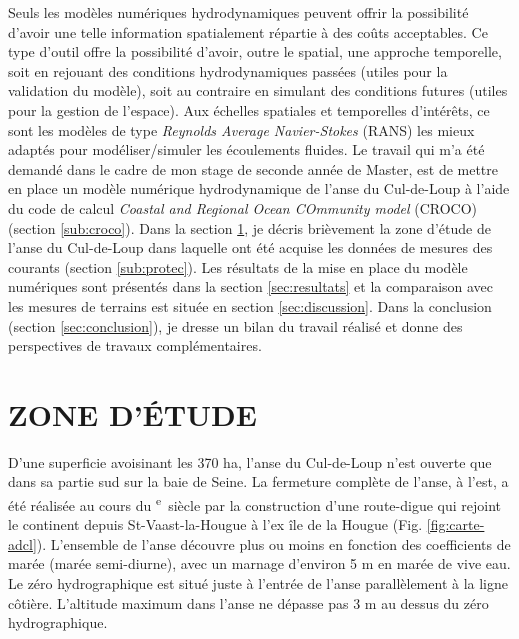 \documentclass[10pt,a4paper,titlepage]{article}
\def\siecle#1{\textsc{\romannumeral #1}\textsuperscript{e}~siècle}
\begin{document}
    Seuls les modèles numériques hydrodynamiques peuvent offrir la possibilité d'avoir une telle information spatialement répartie à des coûts acceptables. Ce type d'outil offre la possibilité d'avoir, outre le spatial, une approche temporelle, soit en rejouant des conditions hydrodynamiques passées (utiles pour la validation du modèle), soit au contraire en simulant des conditions futures (utiles pour la gestion de l'espace). Aux échelles spatiales et temporelles d'intérêts, ce sont les modèles de type \textit{Reynolds Average Navier-Stokes} (RANS) les mieux adaptés pour modéliser/simuler les écoulements fluides.
    Le travail qui m'a été demandé dans le cadre de mon stage de seconde année de Master, est de mettre en place un modèle numérique hydrodynamique de l'anse du Cul-de-Loup à l'aide du code de calcul \textit{Coastal and Regional Ocean COmmunity model} (CROCO) (section \ref{sub:croco}). Dans la section \ref{sec:adcl}, je décris brièvement la zone d'étude de l'anse du Cul-de-Loup dans laquelle ont été acquise les données de mesures des courants (section \ref{sub:protec}). Les résultats de la mise en place du modèle numériques sont présentés dans la section \ref{sec:resultats} et la comparaison avec les mesures de terrains est située en section \ref{sec:discussion}. Dans la conclusion (section \ref{sec:conclusion}), je dresse un bilan du travail réalisé et donne des perspectives de travaux complémentaires.
    
    \newpage
    
    \section{ZONE D'ÉTUDE}
    \label{sec:adcl}
    
    
    D'une superficie avoisinant les 370 ha, l'anse du Cul-de-Loup n'est ouverte que dans sa partie sud sur la baie de Seine. La fermeture complète de l'anse, à l'est, a été réalisée au cours du \siecle{17} par la construction d'une route-digue qui rejoint le continent depuis St-Vaast-la-Hougue à l'ex île de la Hougue (Fig. \ref{fig:carte-adcl}). L'ensemble de l'anse découvre plus ou moins en fonction des coefficients de marée (marée semi-diurne), avec un marnage d'environ 5 m en marée de vive eau. Le zéro hydrographique est situé juste à l'entrée de l'anse parallèlement à la ligne côtière. L'altitude maximum dans l'anse ne dépasse pas 3 m au dessus du zéro hydrographique.
    
\end{document}
